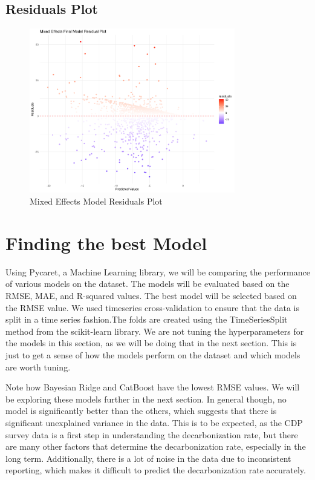\subsection{Residuals Plot}
\begin{figure}[H]
    \centering
    \includegraphics[width=0.8\textwidth]{figures/final_model_residuals.png}
    \caption{Mixed Effects Model Residuals Plot}
    \label{fig:mixed_effects_residuals}
\end{figure}

\section{Finding the best Model}
Using Pycaret, a Machine Learning library, we will be comparing the performance of various models on the dataset. The models will be evaluated based on the RMSE, MAE, and R-squared values. The best model will be selected based on the RMSE value. We used timeseries cross-validation to ensure that the data is split in a time series fashion.The folds are created using the TimeSeriesSplit method from the scikit-learn library. We are not tuning the hyperparameters for the models in this section, as we will be doing that in the next section. This is just to get a sense of how the models perform on the dataset and which models are worth tuning.



\noindent Note how Bayesian Ridge and CatBoost have the lowest RMSE values. We will be exploring these models further in the next section. In general though, no model is significantly better than the others, which suggests that there is significant unexplained variance in the data. This is to be expected, as the CDP survey data is a first step in understanding the decarbonization rate, but there are many other factors that determine the decarbonization rate, especially in the long term. Additionally, there is a lot of noise in the data due to inconsistent reporting, which makes it difficult to predict the decarbonization rate accurately.

